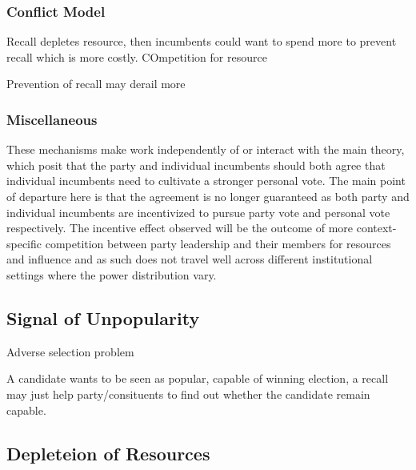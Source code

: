 \documentclass[hyphens, crop=false]{standalone}
\begin{document}
		
		\subsubsection*{Conflict Model}
		
		
		Recall depletes resource,
		then incumbents could want to spend more to
		prevent recall which is more costly.
		COmpetition for resource
		
		Prevention of recall may derail more
		
		
		
		\subsubsection*{Miscellaneous}
		These mechanisms make work independently of or interact with the main theory,
		which posit that the party and individual incumbents should both agree that
		individual incumbents need to cultivate a stronger personal vote.
		The main point of departure here is that
		the agreement is no longer guaranteed
		as both party and individual incumbents
		are incentivized to pursue party vote and personal vote respectively.
		The incentive effect observed will be the
		outcome of more context-specific competition between
		party leadership and their members for resources and influence
		and as such does not travel well across different institutional settings
		where the power distribution vary.
	
		\subsection*{Signal of Unpopularity}
		
		Adverse selection problem
		
		A candidate wants to be seen as popular, capable of winning election,
		a recall may just help party/consituents to find out whether
		the candidate remain capable.
		
	
		\subsection*{Depleteion of Resources}

	
		
	\newpage
	\printbibliography
	
\end{document}
